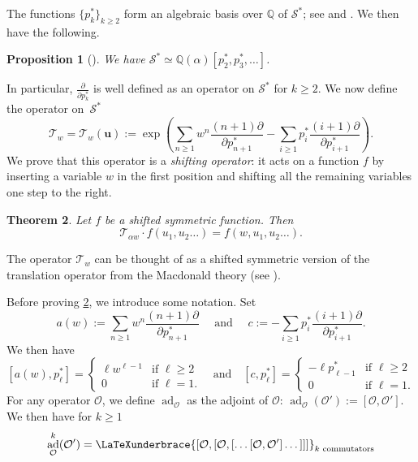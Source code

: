 \documentclass[12pt]{amsart}
\newtheorem{thm}{Theorem}[section]
\newtheorem{prop}[thm]{Proposition}
\theoremstyle{remark}
\newcommand{\bfu}{\boldsymbol{u}}
\newcommand{\QQ}{\mathbb Q}
\newcommand{\Top}{\mathcal{T}}
\DeclareMathOperator{\ad}{ad}
\newcommand{\mcO}{\mathcal{O}}
\newcommand{\mcS}{\mathcal{S}}
\newcommand{\mcSstar}{\mathcal{S}^*}
\let\underbrace\LaTeXunderbrace
\begin{document}
The functions $\{p_k^*\}_{k\geq 2}$ form an algebraic basis over $\QQ$ of $\mcSstar$; see \cite[Corollary 2.8]{IvanovOlshanski2002} and \cite[Section 2]{DolegaFeray2016}.   We then have the following.
\begin{prop}[\cite{IvanovOlshanski2002,DolegaFeray2016}]
    We have $\mcS^*\simeq \QQ(\alpha)[p_2^*,p_3^*,\dots]$.
\end{prop}
In particular, $\frac{\partial}{\partial p_k^*}$ is well defined as an operator on $\mcSstar$ for $k\geq 2$. We now define the operator on~$\mcS^*$
\begin{equation*}
    \Top_w=\Top_w(\bfu):=\exp\left(\sum_{n\geq 1}w^n\frac{(n+1)\partial}{\partial p^*_{n+1}}-\sum_{i\geq 1}p^*_{i}\frac{(i+1)
    \partial}{\partial p^*_{i+1}}\right).
\end{equation*}
We prove that this operator is a \emph{shifting operator}: it acts on a function $f$ by inserting a variable $w$ in the first position and shifting all the remaining variables one step to the right.
\begin{thm}\label{thm:Top_shift}
    Let $f$ be a shifted symmetric function. Then
    $$\Top_{\alpha w}\cdot f(u_1,u_2\dots)=f(w,u_1,u_2\dots).$$
\end{thm}
The operator $\Top_w$ can be thought of as a shifted symmetric version of the translation operator from the Macdonald theory (see \cite[Theorem 1.1]{BergeronGarsiaHaimanTesler1999}). 


Before proving \cref{thm:Top_shift}, we introduce some notation. Set
$$a(w):=\sum_{n\geq 1}w^n\frac{(n+1)\partial}{\partial p^*_{n+1}}\quad\text{ and }\quad c:=-\sum_{i\geq 1}p^*_{i}\frac{(i+1)
    \partial}{\partial p^*_{i+1}}.$$
    We then have
    \begin{equation}\label{eq:comm_a_c_p}
      [a(w),p^*_{\ell}]=
    \begin{cases}
        \ell w^{\ell-1} &\text{if }\ell\geq 2\\
        0&\text{if }\ell=1.
    \end{cases}\quad \text{and}\quad [c,p^*_{\ell}]=
    \begin{cases}
        -\ell p^*_{\ell-1} &\text{if }\ell\geq 2\\
        0&\text{if }\ell=1.
    \end{cases}  
    \end{equation}
For any operator $\mcO$, we define $\ad_\mcO$ as the adjoint of $\mcO$: $\ad_\mcO(\mcO'):=[\mcO,\mcO'].$ We then have for $k\geq 1$
$$\ad_\mcO^k(\mcO')=\underbrace{\left[\mcO,\left[\mcO,\left[\dots[\mcO,\mcO']\dots\right]\right]\right]}_{\text{$k$ commutators}}$$
\end{document}
